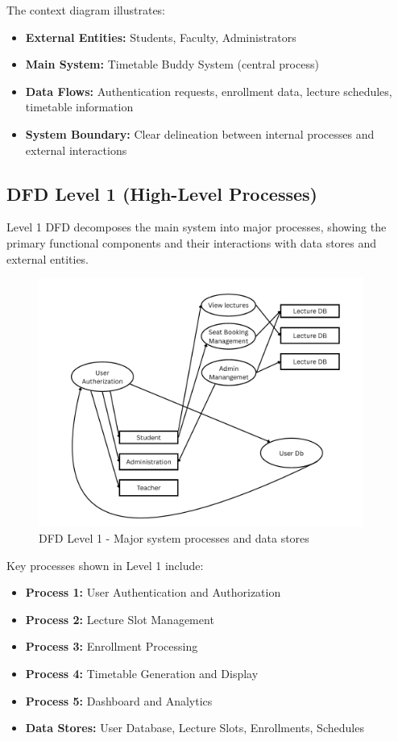 The context diagram illustrates:
\begin{itemize}[leftmargin=*]
    \item \textbf{External Entities:} Students, Faculty, Administrators
    \item \textbf{Main System:} Timetable Buddy System (central process)
    \item \textbf{Data Flows:} Authentication requests, enrollment data, lecture schedules, timetable information
    \item \textbf{System Boundary:} Clear delineation between internal processes and external interactions
\end{itemize}

\subsection{DFD Level 1 (High-Level Processes)}

Level 1 DFD decomposes the main system into major processes, showing the primary functional components and their interactions with data stores and external entities.

\begin{figure}[ht]
    \centering
    \includegraphics[width=0.95\textwidth]{images/DFD Level 1.png}
    \caption{DFD Level 1 - Major system processes and data stores}
    \label{fig:dfd1}
\end{figure}

Key processes shown in Level 1 include:
\begin{itemize}[leftmargin=*]
    \item \textbf{Process 1:} User Authentication and Authorization
    \item \textbf{Process 2:} Lecture Slot Management
    \item \textbf{Process 3:} Enrollment Processing
    \item \textbf{Process 4:} Timetable Generation and Display
    \item \textbf{Process 5:} Dashboard and Analytics
    \item \textbf{Data Stores:} User Database, Lecture Slots, Enrollments, Schedules
\end{itemize}

